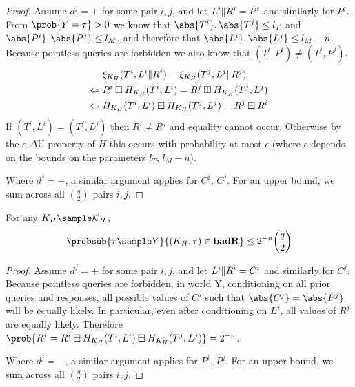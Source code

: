 \documentclass[eprint.tex]{subfiles}
\begin{document}
\begin{proof}
Assume $d^j = +$ for some pair $i, j$, and let $L^i \Vert R^i = P^i$ and similarly for $P^j$.
From $\prob{Y = \tau} > 0$ we know that $\abs{T^i}, \abs{T^j} \leq l_T$ and $\abs{P^i}, \abs{P^j} \leq l_M$,
and therefore that $\abs{L^i}, \abs{L^j} \leq l_M - n$.
Because pointless queries are forbidden we also know that $(T^i, P^i) \neq (T^j, P^j)$.
%
\begin{align*}
    {}&\xi_{K_H}(T^i, L^i \Vert R^i) = \xi_{K_H}(T^j, L^j \Vert R^j) \\
    \Leftrightarrow{}& R^i \boxplus H_{K_H}(T^i, L^i) = R^j \boxplus H_{K_H}(T^j, L^j) \\
    \Leftrightarrow{}& H_{K_H}(T^i, L^i) \boxminus H_{K_H}(T^j, L^j) = R^j \boxminus R^i \\
\end{align*}
%
If $(T^i, L^i) = (T^j, L^j)$ then $R^i \neq R^j$ and equality cannot occur.
Otherwise by the $\epsilon$-$\Delta$U property of $H$ this occurs with probability
at most $\epsilon$ (where $\epsilon$ depends on the bounds on
the parameters $l_T$, $l_M -n$).

Where $d^j = -$, a similar argument applies for $C^i$, $C^j$.
For an upper bound, we sum across all $\binom{q}{2}$ pairs $i, j$.
\end{proof}

\begin{lemma} \label{badR}
    For any $K_H \sample \mathcal{K}_H$,
    \begin{displaymath}
        \probsub{\tau \sample Y}{(K_H, \tau) \in \badR}
        \leq 2^{-n} \binom{q}{2}
    \end{displaymath}
\end{lemma}

\begin{proof}
    Assume $d^j = +$ for some pair $i, j$, and let $L^i \Vert R^i = C^i$ and similarly for $C^j$.
    Because pointless queries are forbidden, in world Y,
    conditioning on all prior queries and responses,
    all possible values of $C^j$ such that $\abs{C^j} = \abs{P^j}$ will be equally likely.
    In particular, even after conditioning on $L^j$,
    all values of $R^j$ are equally likely. Therefore
    $\prob{R^j = R^i \boxplus H_{K_H}(T^i, L^i) \boxminus H_{K_H}(T^j, L^j)} = 2^{-n}$.

    Where $d^j = -$, a similar argument applies for $P^i$, $P^j$.
    For an upper bound, we sum across all $\binom{q}{2}$ pairs $i, j$.
\end{proof}
\end{document}
